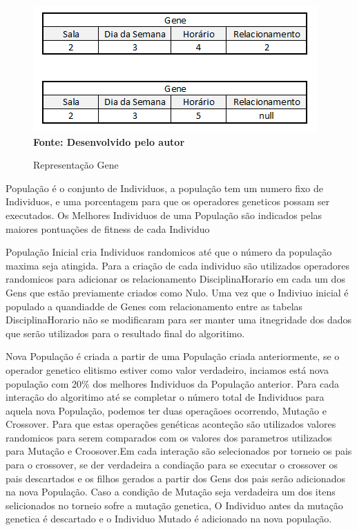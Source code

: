 \documentclass{abntpuc}
\begin{document}
\begin{figure}[!htb]
\caption[Representação Gene]{Representação Gene}
\label{fig:figura5}
\centering
\includegraphics[scale=0.7]{imagens/representacaoGene.png}
\\ \textbf{\footnotesize Fonte: Desenvolvido pelo autor}
\end{figure}



População é o conjunto de Individuos, a população tem um numero fixo de Individuos, e uma porcentagem para que os operadores geneticos possam ser executados. Os Melhores Individuos de uma População são indicados pelas maiores pontuações de fitness de cada Individuo\par

População Inicial cria Individuos randomicos até que o número da população maxima seja atingida. Para a criação de cada individuo são utilizados operadores randomicos para adicionar os relacionamento DisciplinaHorario em cada um dos Gens que estão previamente criados como Nulo. Uma vez que o Indiviuo inicial é populado a quandiadde de Genes com relacionamento entre as tabelas DisciplinaHorario não se modificaram para ser manter uma itnegridade dos dados que serão utilizados para o resultado final do algoritimo.\par

Nova População é criada a partir de uma População criada anteriormente, se o operador genetico elitismo estiver como valor verdadeiro, inciamos está nova população com 20\% dos melhores Individuos da População anterior. Para cada interação do algoritimo até se completar o número total de Individuos para aquela nova População, podemos ter duas operaçãoes ocorrendo, Mutação e Crossover. Para que estas operações genéticas aconteção são utilizados valores randomicos para serem comparados com os valores dos parametros utilizados para Mutação e Croosover.Em cada interação são selecionados por torneio os pais para o crossover, se der verdadeira a condiação para se executar o crossover os pais descartados e os filhos gerados a partir dos Gens dos pais serão adicionados na nova População. Caso a condição de Mutação seja verdadeira um dos itens selicionados no torneio sofre a mutação genetica, O Individuo antes da mutação genetica é descartado e o Individuo Mutado é adicionado na nova população.\par
\end{document}
